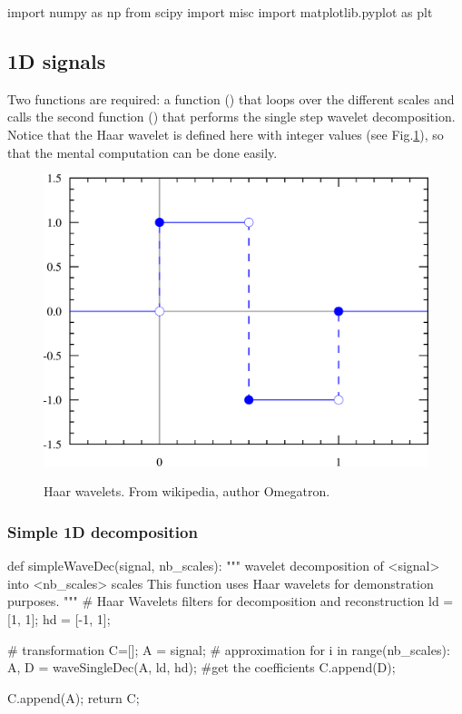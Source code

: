 \def\QRCODE{MASTER_mispa_TUT.IMG.wavelets_pythonqrcode.png}
\def\QRPAGE{http://www.iptutorials.science/tree/master/MASTER_mispa/TUT.IMG.wavelets/python}



\begin{python}
import numpy as np
from scipy import misc
import matplotlib.pyplot as plt
\end{python}

\subsection{1D signals}
Two functions are required: a function () that loops over the different scales and calls the second function () that performs the single step wavelet decomposition. Notice that the Haar wavelet is defined here with integer values (see Fig.\ref{fig:wavelets:python:haar}), so that the mental computation can be done easily.

\begin{figure}[htbp]
 \centering\caption{Haar wavelets. From wikipedia, author Omegatron.}%
 \includegraphics[width=.55\linewidth]{Haar_wavelet.pdf}%
 \label{fig:wavelets:python:haar}%
\end{figure}


\subsubsection{Simple 1D decomposition}
\begin{python}
def simpleWaveDec(signal, nb_scales):
    """
    wavelet decomposition of <signal> into <nb_scales> scales
    This function uses Haar wavelets for demonstration purposes.
    """
    # Haar Wavelets filters for decomposition and reconstruction
    ld = [1, 1];
    hd = [-1, 1];
    
    # transformation
    C=[];
    A = signal; # approximation
    for i in range(nb_scales):
        A, D = waveSingleDec(A, ld, hd);
        #get the coefficients
        C.append(D);
   
    C.append(A);
    return C;
\end{python}

